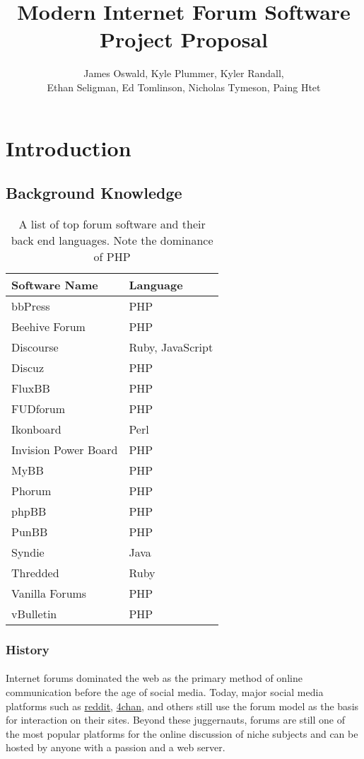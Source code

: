 \documentclass[]{article}
\title{Modern Internet Forum Software \\ Project Proposal}
\author{James Oswald, Kyle Plummer, Kyler Randall, \\ Ethan Seligman, Ed Tomlinson, Nicholas Tymeson, Paing Htet}
\date{}
\begin{document}
\maketitle
\thispagestyle{fancy}

\section{Introduction}
\subsection{Background Knowledge}

\begin{wraptable}{r}{5.5cm}
\begin{tabular}{|l|l|}

\hline
\textbf{Software Name} & \textbf{Language} \\
\hline
bbPress & PHP \\
Beehive Forum & PHP \\
Discourse & Ruby, JavaScript \\
Discuz & PHP \\
FluxBB & PHP \\
FUDforum & PHP \\
Ikonboard & Perl \\
Invision Power Board & PHP \\
MyBB & PHP \\
Phorum & PHP \\
phpBB & PHP \\
PunBB & PHP \\
Syndie & Java \\
Thredded & Ruby \\
Vanilla Forums & PHP \\
vBulletin & PHP \\
\hline
\end{tabular}
\captionsetup{belowskip=0pt}
\caption{A list of top forum software and their back end languages. Note the dominance of PHP}
\end{wraptable}
\subsubsection{History}
\paragraph{}
Internet forums dominated the web as the primary method of online communication before the age of social media. Today, major social media platforms such as \href{https://www.reddit.com/}{reddit}, \href{https://www.4channel.org/}{4chan}, and others still use the forum model as the basis for interaction on their sites. Beyond these juggernauts, forums are still one of the most popular platforms for the online discussion of niche subjects and can be hosted by anyone with a passion and a web server. 
\end{document}
